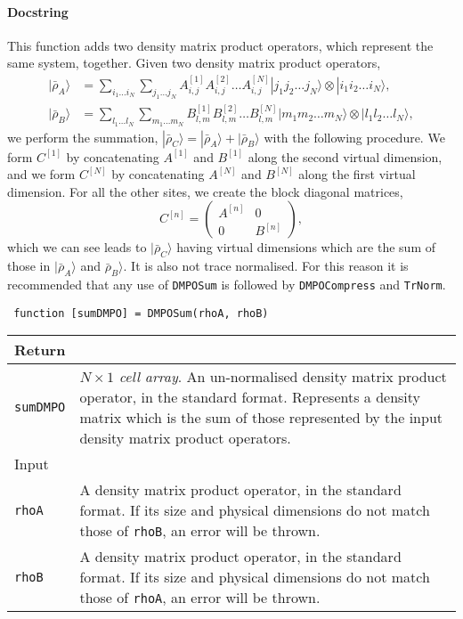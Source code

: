  \paragraph{Docstring} This function adds two density matrix product operators, which represent the same system, together. Given two density matrix product operators, 
 \begin{align}
 |\bar{\rho}_{A} \rangle &= \sum_{i_{1}\ldots i_{N}} \sum_{j_{1} \ldots j_{N}} A^{[1]}_{i,j} A^{[2]}_{i,j} \ldots A^{[N]}_{i,j} |j_{1} j_{2} \ldots j_{N} \rangle \otimes |i_{1} i_{2} \ldots i_{N} \rangle, \label{eq:vs3-5} \\
 |\bar{\rho}_{B} \rangle &= \sum_{l_{1} \ldots l_{N}} \sum_{m_{1} \ldots m_{N}} B^{[1]}_{l,m} B^{[2]}_{l,m} \ldots B^{[N]}_{l,m} |m_{1} m_{2} \ldots m_{N} \rangle \otimes |l_{1} l_{2} \ldots l_{N} \rangle, \label{eq:vs3-6} 
 \end{align}
 we perform the summation, \(|\bar{\rho}_{C} \rangle = |\bar{\rho}_{A} \rangle + |\bar{\rho}_{B} \rangle\) with the following procedure. We form \(C^{[1]}\) by concatenating \(A^{[1]}\) and \(B^{[1]}\) along the second virtual dimension, and we form \(C^{[N]}\) by concatenating \(A^{[N]}\) and \(B^{[N]}\) along the first virtual dimension. For all the other sites, we create the block diagonal matrices,
 \begin{equation}
 C^{[n]} = \begin{pmatrix}
 A^{[n]} & 0 \\ 
 0 & B^{[n]} \end{pmatrix}, 
 \label{eq:vs3-7}
 \end{equation}
 which we can see leads to \(|\bar{\rho}_{C} \rangle \) having virtual dimensions which are the sum of those in \(|\bar{\rho}_{A}\rangle\) and \(\bar{\rho}_{B}\rangle\). It is also not trace normalised. For this reason it is recommended that any use of \lstinline$DMPOSum$ is followed by \lstinline$DMPOCompress$ and \lstinline$TrNorm$. 
 \begin{lstlisting}
 function [sumDMPO] = DMPOSum(rhoA, rhoB) \end{lstlisting}
 \begin{longtabu}{X[1,l]X[4,l]}
 \hline
 Return & \\ \hline
 \lstinline$sumDMPO$ & \emph{\(N \times 1\) cell array}. An un-normalised density matrix product operator, in the standard format. Represents a density matrix which is the sum of those represented by the input density matrix product operators. \\ \hline
 Input & \\ \hline
 \lstinline$rhoA$ & A density matrix product operator, in the standard format. If its size and physical dimensions do not match those of \lstinline$rhoB$, an error will be thrown. \\ 
 \lstinline$rhoB$ & A density matrix product operator, in the standard format. If its size and physical dimensions do not match those of \lstinline$rhoA$, an error will be thrown. \\ 
 \hline
 \end{longtabu}
